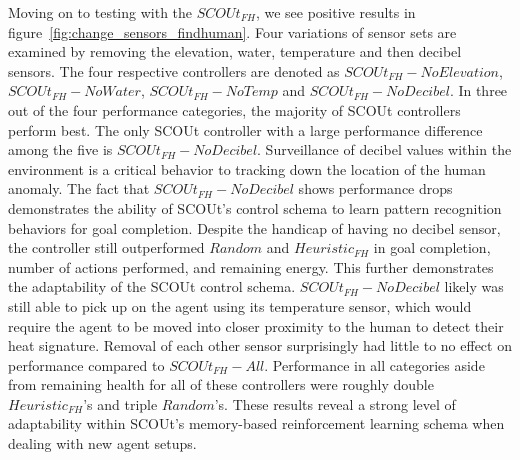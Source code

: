 Moving on to testing with the $SCOUt_{FH}$, we see positive results in figure~\ref{fig:change_sensors_findhuman}.
Four variations of sensor sets are examined by removing the elevation, water, temperature and then decibel sensors.
The four respective controllers are denoted as $SCOUt_{FH} - No Elevation$, $SCOUt_{FH} - No Water$, $SCOUt_{FH} - No Temp$ and $SCOUt_{FH} - No Decibel$.
In three out of the four performance categories, the majority of SCOUt controllers perform best.
The only SCOUt controller with a large performance difference among the five is $SCOUt_{FH} - No Decibel$.
Surveillance of decibel values within the environment is a critical behavior to tracking down the location of the human anomaly.
The fact that $SCOUt_{FH} - No Decibel$ shows performance drops demonstrates the ability of SCOUt's control schema to learn pattern recognition behaviors for goal completion.
Despite the handicap of having no decibel sensor, the controller still outperformed $Random$ and $Heuristic_{FH}$ in goal completion, number of actions performed, and remaining energy.
This further demonstrates the adaptability of the SCOUt control schema.
$SCOUt_{FH} - No Decibel$ likely was still able to pick up on the agent using its temperature sensor, which would require the agent to be moved into closer proximity to the human to detect their heat signature.
Removal of each other sensor surprisingly had little to no effect on performance compared to $SCOUt_{FH} - All$.
Performance in all categories aside from remaining health for all of these controllers were roughly double $Heuristic_{FH}$'s and triple $Random$'s.
These results reveal a strong level of adaptability within SCOUt's memory-based reinforcement learning schema when dealing with new agent setups.

